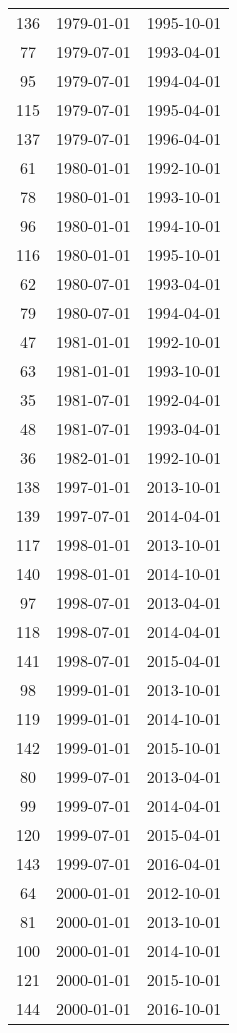 \begin{tabular}{ccc}
  136 & 1979-01-01 & 1995-10-01 \\ 
  77 & 1979-07-01 & 1993-04-01 \\ 
  95 & 1979-07-01 & 1994-04-01 \\ 
  115 & 1979-07-01 & 1995-04-01 \\ 
  137 & 1979-07-01 & 1996-04-01 \\ 
  61 & 1980-01-01 & 1992-10-01 \\ 
  78 & 1980-01-01 & 1993-10-01 \\ 
  96 & 1980-01-01 & 1994-10-01 \\ 
  116 & 1980-01-01 & 1995-10-01 \\ 
  62 & 1980-07-01 & 1993-04-01 \\ 
  79 & 1980-07-01 & 1994-04-01 \\ 
  47 & 1981-01-01 & 1992-10-01 \\ 
  63 & 1981-01-01 & 1993-10-01 \\ 
  35 & 1981-07-01 & 1992-04-01 \\ 
  48 & 1981-07-01 & 1993-04-01 \\ 
  36 & 1982-01-01 & 1992-10-01 \\ 
  138 & 1997-01-01 & 2013-10-01 \\ 
  139 & 1997-07-01 & 2014-04-01 \\ 
  117 & 1998-01-01 & 2013-10-01 \\ 
  140 & 1998-01-01 & 2014-10-01 \\ 
  97 & 1998-07-01 & 2013-04-01 \\ 
  118 & 1998-07-01 & 2014-04-01 \\ 
  141 & 1998-07-01 & 2015-04-01 \\ 
  98 & 1999-01-01 & 2013-10-01 \\ 
  119 & 1999-01-01 & 2014-10-01 \\ 
  142 & 1999-01-01 & 2015-10-01 \\ 
  80 & 1999-07-01 & 2013-04-01 \\ 
  99 & 1999-07-01 & 2014-04-01 \\ 
  120 & 1999-07-01 & 2015-04-01 \\ 
  143 & 1999-07-01 & 2016-04-01 \\ 
  64 & 2000-01-01 & 2012-10-01 \\ 
  81 & 2000-01-01 & 2013-10-01 \\ 
  100 & 2000-01-01 & 2014-10-01 \\ 
  121 & 2000-01-01 & 2015-10-01 \\ 
  144 & 2000-01-01 & 2016-10-01 \\ 

\end{tabular}
